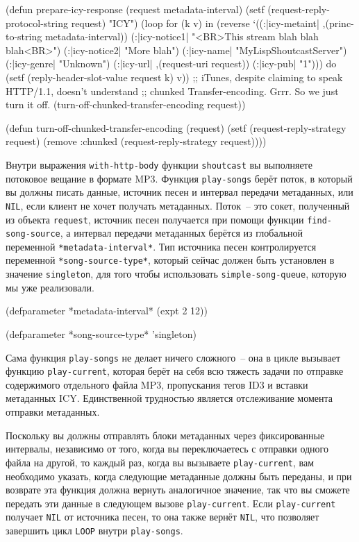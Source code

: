 \begin{myverb}
(defun prepare-icy-response (request metadata-interval)
  (setf (request-reply-protocol-string request) "ICY")
  (loop for (k v) in (reverse
       `((:|icy-metaint| ,(princ-to-string metadata-interval))
         (:|icy-notice1| "<BR>This stream blah blah blah<BR>")
         (:|icy-notice2| "More blah")
         (:|icy-name|    "MyLispShoutcastServer")
         (:|icy-genre|   "Unknown")
         (:|icy-url|     ,(request-uri request))
         (:|icy-pub|     "1")))
     do (setf (reply-header-slot-value request k) v))
  ;; iTunes, despite claiming to speak HTTP/1.1, doesn't understand
  ;; chunked Transfer-encoding. Grrr. So we just turn it off.
  (turn-off-chunked-transfer-encoding request))

(defun turn-off-chunked-transfer-encoding (request)
  (setf (request-reply-strategy request)
        (remove :chunked (request-reply-strategy request))))
\end{myverb}

Внутри выражения \lstinline{with-http-body} функции \lstinline{shoutcast} вы выполняете потоковое
вещание в формате MP3.  Функция \lstinline{play-songs} берёт поток, в который вы должны писать
данные, источник песен и интервал передачи метаданных, или \lstinline{NIL}, если клиент не
хочет получать метаданных.  Поток~-- это сокет, полученный из объекта \lstinline{request},
источник песен получается при помощи функции \lstinline{find-song-source}, а интервал передачи
метаданных берётся из глобальной переменной \lstinline{*metadata-interval*}.  Тип источника
песен контролируется переменной \lstinline{*song-source-type*}, который сейчас должен быть
установлен в значение \lstinline{singleton}, для того чтобы использовать
\lstinline{simple-song-queue}, которую мы уже реа\-ли\-зо\-ва\-ли.

\begin{myverb}
(defparameter *metadata-interval* (expt 2 12))

(defparameter *song-source-type* 'singleton)
\end{myverb}

Сама функция \lstinline{play-songs} не делает ничего сложного~-- она в цикле вызывает функцию
\lstinline{play-current}, которая берёт на себя всю тяжесть задачи по отправке содержимого
отдельного файла MP3, пропускания тегов ID3 и вставки метаданных ICY.  Единственной
трудностью является отслеживание момента отправки метаданных.

Поскольку вы должны отправлять блоки метаданных через фиксированные интервалы, независимо
от того, когда вы переключаетесь с отправки одного файла на другой, то каждый раз, когда вы
вызываете \lstinline{play-current}, вам необходимо указать, когда следующие метаданные должны
быть переданы, и при возврате эта функция должна вернуть аналогичное значение, так что вы
сможете передать эти данные в следующем вызове \lstinline{play-current}.  Если
\lstinline{play-current} получает \lstinline{NIL} от источника песен, то она также вернёт
\lstinline{NIL}, что позволяет завершить цикл \lstinline{LOOP} внутри \lstinline{play-songs}.

